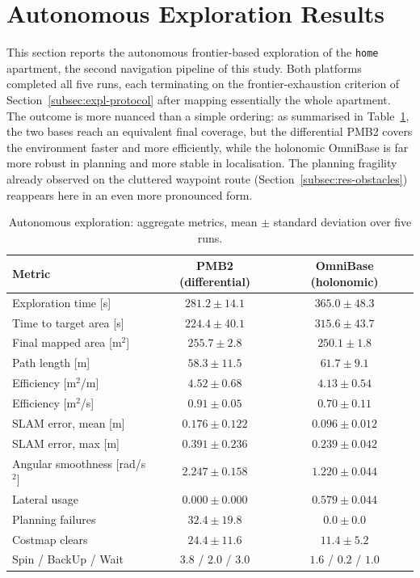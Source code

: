 \section{Autonomous Exploration Results}
\label{sec:expl-results}

This section reports the autonomous frontier-based exploration of the \texttt{home} apartment, the second navigation pipeline of this study. Both platforms completed all five runs, each terminating on the frontier-exhaustion criterion of Section~\ref{subsec:expl-protocol} after mapping essentially the whole apartment. The outcome is more nuanced than a simple ordering: as summarised in Table~\ref{tab:explore}, the two bases reach an equivalent final coverage, but the differential PMB2 covers the environment faster and more efficiently, while the holonomic OmniBase is far more robust in planning and more stable in localisation. The planning fragility already observed on the cluttered waypoint route (Section~\ref{subsec:res-obstacles}) reappears here in an even more pronounced form.

\begin{table}[htbp]
\centering
\caption{Autonomous exploration: aggregate metrics, mean $\pm$ standard deviation over five runs.}
\label{tab:explore}
\begin{tabular}{lcc}
\toprule
Metric & PMB2 (differential) & OmniBase (holonomic) \\
\midrule
Exploration time [s]           & $281.2 \pm 14.1$ & $365.0 \pm 48.3$ \\
Time to target area [s]        & $224.4 \pm 40.1$ & $315.6 \pm 43.7$ \\
Final mapped area [m$^2$]      & $255.7 \pm 2.8$ & $250.1 \pm 1.8$ \\
Path length [m]                & $58.3 \pm 11.5$ & $61.7 \pm 9.1$ \\
Efficiency [m$^2$/m]           & $4.52 \pm 0.68$ & $4.13 \pm 0.54$ \\
Efficiency [m$^2$/s]           & $0.91 \pm 0.05$ & $0.70 \pm 0.11$ \\
SLAM error, mean [m]           & $0.176 \pm 0.122$ & $0.096 \pm 0.012$ \\
SLAM error, max [m]            & $0.391 \pm 0.236$ & $0.239 \pm 0.042$ \\
Angular smoothness [rad/s$^2$] & $2.247 \pm 0.158$ & $1.220 \pm 0.044$ \\
Lateral usage                   & $0.000 \pm 0.000$ & $0.579 \pm 0.044$ \\
Planning failures              & $32.4 \pm 19.8$ & $0.0 \pm 0.0$ \\
Costmap clears                 & $24.4 \pm 11.6$ & $11.4 \pm 5.2$ \\
Spin / BackUp / Wait           & $3.8$ / $2.0$ / $3.0$ & $1.6$ / $0.2$ / $1.0$ \\
\bottomrule
\end{tabular}
\end{table}

